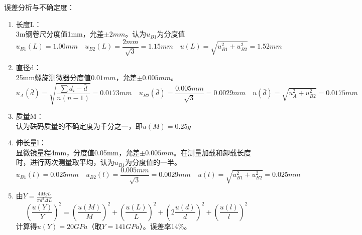 \documentclass[11pt]{article}
\begin{document}
\par \noindent 误差分析与不确定度：
\begin{enumerate}
    \item 长度L：
    \\ 3m钢卷尺分度值1mm，允差$\pm 2mm$。认为$u_{B1}$为分度值
    \[u_{B1}(L)=1.00mm\quad u_{B2}(L)=\frac{ 2mm}{\sqrt{3}}=1.15mm\quad u(L)=\sqrt{u_{B1}^2+u_{B2}^2}=1.52mm\]
    \item 直径d：
    \\25mm螺旋测微器分度值$0.01mm$，允差$\pm 0.005mm$。
    \[u_A(\bar{d})=\sqrt{\frac{\sum d_i-\bar{d}}{n(n-1)}}=0.0173mm\quad u_{B2}(\bar{d})=\frac{ 0.005mm}{\sqrt{3}}=0.0029mm\quad u(\bar{d})=\sqrt{u_A^2+u_{B2}^2}=0.0175mm\]
    \item 质量M：
    \\ 认为砝码质量的不确定度为千分之一，即$u(M)=0.25g$
    \item 伸长量l：
    \\ 显微镜量程4mm，分度值0.05mm，允差$\pm 0.005mm$。在测量加载和卸载长度时，进行两次测量取平均，认为$u_{B1}$为分度值的一半。
    \[u_{B1}(l)=0.025mm \quad u_{B2}(l)=\frac{ 0.005mm}{\sqrt{3}}=0.0029mm \quad u(l)=\sqrt{u_{B1}^2+u_{B2}^2}=0.025mm\]
    \item 由$Y=\frac{4MgL}{\pi d^2\Delta L}$
    \[{\left(\frac{u(Y)}{Y}\right)}^2={\left(\frac{u(M)}{M}\right)}^2+{\left(\frac{u(L)}{L}\right)}^2+{\left(2\frac{u(d)}{d}\right)}^2+{\left(\frac{u(l)}{l}\right)}^2\]
    计算得$u(Y)=20GPa$（取$Y=141GPa$）。误差率14\%。
\end{enumerate}
\end{document}
